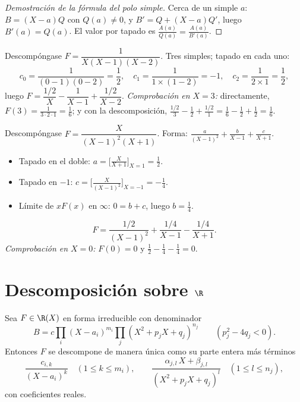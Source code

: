 \begin{proof}[Demostración de la fórmula del polo simple]
Cerca de un  simple $a$: $B = (X - a) Q$ con $Q(a) \neq 0$, y
$B' = Q + (X - a) Q'$, luego $B'(a) = Q(a)$. El valor por tapado es
$\frac{A(a)}{Q(a)} = \frac{A(a)}{B'(a)}$.
\end{proof}

\begin{example}\label{ex:b1:fractions:simple}
Descompóngase $F = \dfrac{1}{X(X-1)(X-2)}$. Tres  simples;
tapado en cada uno:
\[
c_0 = \frac{1}{(0-1)(0-2)} = \frac12,
\quad
c_1 = \frac{1}{1 \times (1 - 2)} = -1,
\quad
c_2 = \frac{1}{2 \times 1} = \frac12,
\]
luego $F = \dfrac{1/2}{X} - \dfrac{1}{X-1} + \dfrac{1/2}{X-2}$.
\emph{Comprobación en $X = 3$:} directamente,
$F(3) = \frac{1}{3\cdot2\cdot1} = \frac16$; y con la descomposición,
$\frac{1/2}{3} - \frac{1}{2} + \frac{1/2}{1} = \frac16 - \frac12 + \frac12 = \frac16$.
\end{example}

\begin{example}\label{ex:b1:fractions:multiple}
Descompóngase $F = \dfrac{X}{(X-1)^2 (X+1)}$. Forma:
$\frac{a}{(X-1)^2} + \frac{b}{X-1} + \frac{c}{X+1}$.
\begin{itemize}
  \item Tapado en el  doble: $a = \bigl[\frac{X}{X+1}\bigr]_{X=1}
        = \frac12$.
  \item Tapado en $-1$: $c = \bigl[\frac{X}{(X-1)^2}\bigr]_{X=-1} =
        -\frac14$.
  \item Límite de $xF(x)$ en $\infty$: $0 = b + c$, luego $b = \frac14$.
\end{itemize}
\[
F = \frac{1/2}{(X-1)^2} + \frac{1/4}{X-1} - \frac{1/4}{X+1} .
\]
\emph{Comprobación en $X = 0$:} $F(0) = 0$ y
$\frac12 - \frac14 - \frac14 = 0$.
\end{example}

\section{Descomposición sobre $\R$}

\begin{theorem}\label{thm:b1:fractions:real}
Sea $F \in \R(X)$ en forma irreducible con denominador
\[
B = c \prod_i (X - a_i)^{m_i} \prod_j (X^2 + p_j X + q_j)^{n_j}
\qquad (p_j^2 - 4q_j < 0).
\]
Entonces $F$ se descompone de manera única como su parte entera más términos
\[
\frac{c_{i,k}}{(X - a_i)^k} \quad (1 \leq k \leq m_i),
\qquad
\frac{\alpha_{j,l}\, X + \beta_{j,l}}{(X^2 + p_j X + q_j)^{l}}
\quad (1 \leq l \leq n_j),
\]
con coeficientes reales.
\end{theorem}

